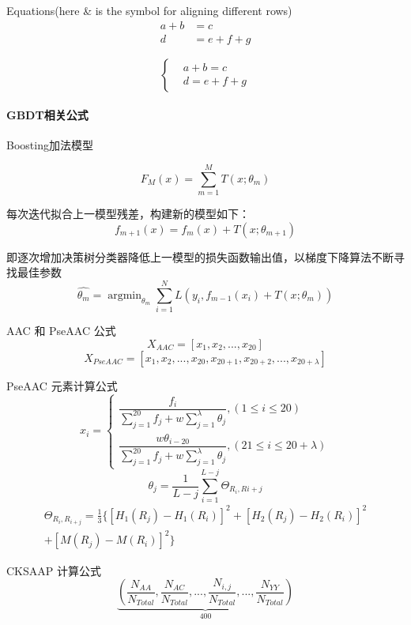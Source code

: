 \documentclass[UTF8]{ctexart}
\begin{document}
Equations(here \& is the symbol for aligning different rows)
\begin{align}
    a+b & =c     \\
    d   & =e+f+g
\end{align}

\[
    \left\{
    \begin{aligned}
         & a+b=c   \\
         & d=e+f+g
    \end{aligned}
    \right.
\]

\paragraph{GBDT相关公式}

Boosting加法模型

\begin{equation}
    F_M(x)=\sum_{m=1}^{M} T(x; \theta_m)
\end{equation}

每次迭代拟合上一模型残差，构建新的模型如下：
\[f_{m+1}(x)=f_{m}(x)+T(x; \theta_{m+1})\]

即逐次增加决策树分类器降低上一模型的损失函数输出值，以梯度下降算法不断寻找最佳参数
\begin{equation}
    \hat{\theta_m}=\mathop{\arg\min}_{\theta_m}\sum_{i=1}^{N}L(y_i, f_{m-1}(x_i)+T(x; \theta_m))
\end{equation}

AAC 和 PseAAC 公式
\begin{equation}
    X_{AAC}=\left [ x_{1},x_{2},...,x_{20} \right ]
\end{equation}
\begin{equation}
    X_{PseAAC}=\left [ x_{1},x_{2},...,x_{20},x_{20+1},x_{20+2},...,x_{20+\lambda}\right ]
\end{equation}

PseAAC 元素计算公式
\begin{equation}
    x_{i}=\begin{cases}
        \dfrac{f_{i}}{\sum_{j=1}^{20}f_{j}+w\sum_{j=1}^{\lambda}\theta_{j}},\left ( 1 \leq i \leq 20 \right ) \\
        \dfrac{w\theta_{i-20}}{\sum_{j=1}^{20}f_{j}+w\sum_{j=1}^{\lambda}\theta_{j}},\left ( 21\leq i \leq 20+\lambda \right )
    \end{cases}
\end{equation}
\begin{equation}
    \theta_{j}=\frac{1}{L-j}\sum_{i=1}^{L-j}\Theta_{R_{i},R{i+j}}
\end{equation}
\begin{multline} 
    \Theta_{R_{i},R_{i+j}}=\frac{1}{3} \{ \left[ H_{1}(R_{j}) - H_{1}(R_{i}) \right]^2 + \left[ H_{2}(R_{j}) - H_{2}(R_{i}) \right]^2 \\
    + \left[ M(R_{j}) - M(R_{i}) \right]^2 \}
\end{multline}

CKSAAP 计算公式
\begin{equation}
    \underbrace{( \frac{N_{AA}}{N_{Total}},\frac{N_{AC}}{N_{Total}},...,\frac{N_{i,j}}{N_{Total}},...,\frac{N_{YY}}{N_{Total}} )}_{400}
\end{equation}
\end{document}
